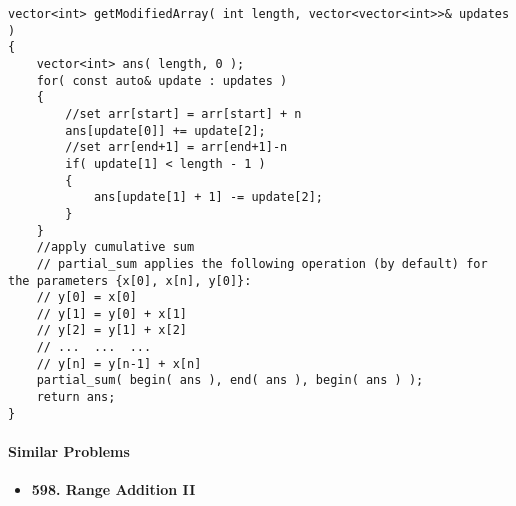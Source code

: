 \setcounter{lstlisting}{0}
\begin{lstlisting}[style=customc, caption={Prefix Sum}]
vector<int> getModifiedArray( int length, vector<vector<int>>& updates )
{
    vector<int> ans( length, 0 );
    for( const auto& update : updates )
    {
        //set arr[start] = arr[start] + n
        ans[update[0]] += update[2];
        //set arr[end+1] = arr[end+1]-n
        if( update[1] < length - 1 )
        {
            ans[update[1] + 1] -= update[2];
        }
    }
    //apply cumulative sum
    // partial_sum applies the following operation (by default) for the parameters {x[0], x[n], y[0]}:
    // y[0] = x[0]
    // y[1] = y[0] + x[1]
    // y[2] = y[1] + x[2]
    // ...  ...  ...
    // y[n] = y[n-1] + x[n]
    partial_sum( begin( ans ), end( ans ), begin( ans ) );
    return ans;
}
\end{lstlisting}

\paragraph{Similar Problems}
\begin{itemize}
\item \textbf{598. Range Addition II}
\end{itemize}